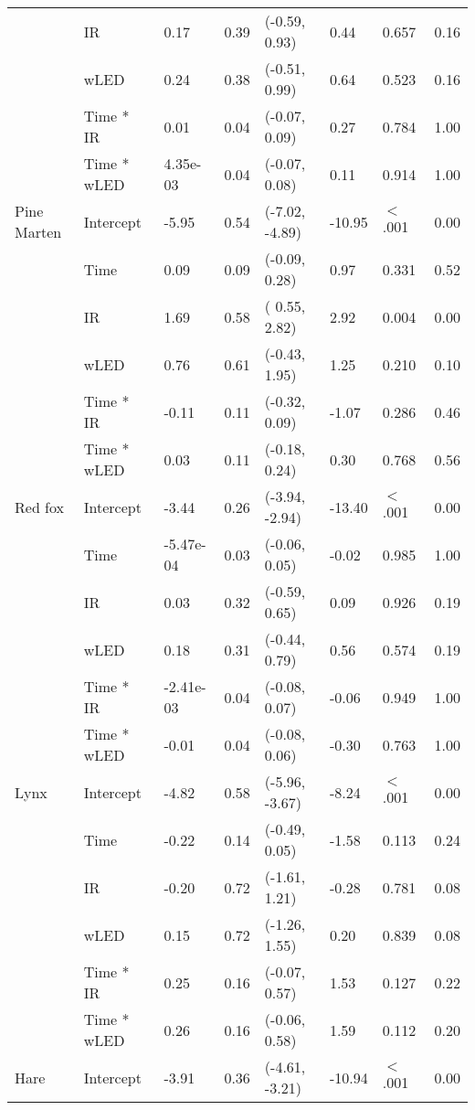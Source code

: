 \begin{table}[ht]
\begin{tabular}{lllllllr}
   & IR & 0.17 & 0.39 & (-0.59,  0.93) & 0.44 & 0.657  & 0.16 \\ 
   & wLED & 0.24 & 0.38 & (-0.51,  0.99) & 0.64 & 0.523  & 0.16 \\ 
   & Time * IR & 0.01 & 0.04 & (-0.07,  0.09) & 0.27 & 0.784  & 1.00 \\ 
   & Time * wLED & 4.35e-03 & 0.04 & (-0.07,  0.08) & 0.11 & 0.914  & 1.00 \\ 
  Pine Marten & Intercept & -5.95 & 0.54 & (-7.02, -4.89) & -10.95 & $<$ .001 & 0.00 \\ 
   & Time & 0.09 & 0.09 & (-0.09,  0.28) & 0.97 & 0.331  & 0.52 \\ 
   & IR & 1.69 & 0.58 & ( 0.55,  2.82) & 2.92 & 0.004  & 0.00 \\ 
   & wLED & 0.76 & 0.61 & (-0.43,  1.95) & 1.25 & 0.210  & 0.10 \\ 
   & Time * IR & -0.11 & 0.11 & (-0.32,  0.09) & -1.07 & 0.286  & 0.46 \\ 
   & Time * wLED & 0.03 & 0.11 & (-0.18,  0.24) & 0.30 & 0.768  & 0.56 \\ 
  Red fox & Intercept & -3.44 & 0.26 & (-3.94, -2.94) & -13.40 & $<$ .001 & 0.00 \\ 
   & Time & -5.47e-04 & 0.03 & (-0.06,  0.05) & -0.02 & 0.985  & 1.00 \\ 
   & IR & 0.03 & 0.32 & (-0.59,  0.65) & 0.09 & 0.926  & 0.19 \\ 
   & wLED & 0.18 & 0.31 & (-0.44,  0.79) & 0.56 & 0.574  & 0.19 \\ 
   & Time * IR & -2.41e-03 & 0.04 & (-0.08,  0.07) & -0.06 & 0.949  & 1.00 \\ 
   & Time * wLED & -0.01 & 0.04 & (-0.08,  0.06) & -0.30 & 0.763  & 1.00 \\ 
  Lynx & Intercept & -4.82 & 0.58 & (-5.96, -3.67) & -8.24 & $<$ .001 & 0.00 \\ 
   & Time & -0.22 & 0.14 & (-0.49,  0.05) & -1.58 & 0.113  & 0.24 \\ 
   & IR & -0.20 & 0.72 & (-1.61,  1.21) & -0.28 & 0.781  & 0.08 \\ 
   & wLED & 0.15 & 0.72 & (-1.26,  1.55) & 0.20 & 0.839  & 0.08 \\ 
   & Time * IR & 0.25 & 0.16 & (-0.07,  0.57) & 1.53 & 0.127  & 0.22 \\ 
   & Time * wLED & 0.26 & 0.16 & (-0.06,  0.58) & 1.59 & 0.112  & 0.20 \\ 
  Hare & Intercept & -3.91 & 0.36 & (-4.61, -3.21) & -10.94 & $<$ .001 & 0.00 \\ 

\end{tabular}
\end{table}
